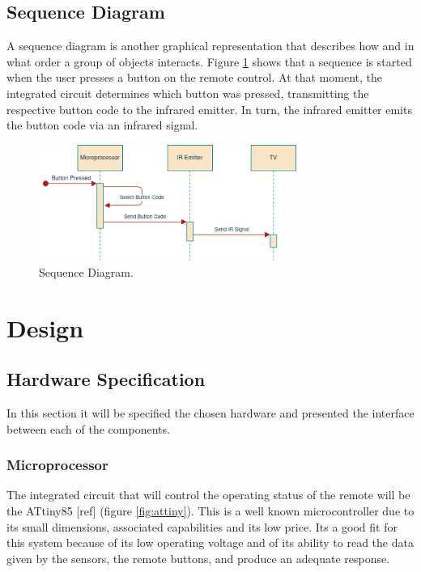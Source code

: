 \documentclass[12pt, letterpaper]{report}
\begin{document}
\section{Sequence Diagram}
A sequence diagram is another graphical representation that describes how and in what order a group of objects interacts. Figure \ref{fig:seq_diagram} shows that a sequence is started when the user presses a button on the remote control. At that moment, the integrated circuit determines which button was pressed, transmitting the respective button code to the infrared emitter. In turn, the infrared emitter emits the button code via an infrared signal.

\begin{figure}[ht]
	\centering
	\includegraphics[width=0.75\textwidth]{SequeceDiagram}
	\caption{Sequence Diagram.}
	\label{fig:seq_diagram}
\end{figure}

\chapter{Design}
\section{Hardware Specification}
In this section it will be specified the chosen hardware and presented the interface between each of the components.

\subsection{Microprocessor}
The integrated circuit that will control the operating status of the remote will be the ATtiny85 [ref] (figure \ref{fig:attiny}). This is a well known microcontroller due to its small dimensions, associated capabilities and its low price. Its a good fit for this system because of its low operating voltage and of its ability to read the data given by the sensors, the remote buttons, and produce an adequate response.
\end{document}
